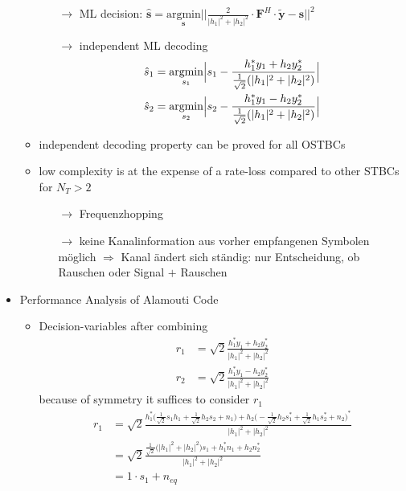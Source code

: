 \documentclass[a4paper, 10pt]{article}
\begin{document}
\begin{itemize}
\begin{itemize}
\begin{itemize}
			\item[$\rightarrow$] ML decision: $\hat{\textbf{s}} = \underset{\textbf{s}}{\text{argmin}}\bigl | \bigl | \frac{2}{|h_1|^2 + |h_2|^2}\cdot \textbf{F}^H\cdot \tilde{\textbf{y}} - \textbf{s}\bigr |\bigr |^2 $
			\item[$\rightarrow$] independent ML decoding 
				\begin{align*}
					\hat{s}_1 &= \underset{s_1}{\text{argmin}} \Bigl |s_1 - \frac{h_1^*y_1 + h_2y_2^*}{\frac{1}{\sqrt{2}}(|h_1|^2 + |h_2|^2)}\Bigr |\\ \hat{s}_2 & = \underset{s_2}{\text{argmin}}\Bigl |s_2 - \frac{h_1^*y_1 - h_2y_2^*}{\frac{1}{\sqrt{2}}(|h_1|^2 + |h_2|^2)}\Bigr|
				\end{align*}
		\end{itemize}
		\item independent decoding property can be proved for all OSTBCs
		\item low complexity is at the expense of a rate-loss compared to other STBCs for $N_T > 2$
		\begin{itemize}
			\item[$\rightarrow$] Frequenzhopping
			\item[$\rightarrow$] keine Kanalinformation aus vorher empfangenen Symbolen m\"oglich $\Rightarrow$ Kanal \"andert sich st\"andig: nur Entscheidung, ob Rauschen oder Signal $+$ Rauschen	
		\end{itemize}
		\end{itemize}
		\item{Performance Analysis of Alamouti Code}
		\begin{itemize}
		\item Decision-variables after combining
		\begin{align*}
			r_1 &= \sqrt{2}\frac{h_1^*y_1 + h_2y_2^*}{|h_1|^2 + |h_2|^2}\\
			r_2 &= \sqrt{2}\frac{h_1^*y_1 - h_2y_2^*}{|h_1|^2 + |h_2|^2}
\end{align*} 
because of symmetry it suffices to consider $r_1$
		\begin{align*}
			r_1 &= \sqrt{2}\frac{h_1^*\bigl(\frac{1}{\sqrt{2}}s_1h_1 + \frac{1}{\sqrt{2}}h_2s_2 + n_1 \bigr) + h_2\bigl(-\frac{1}{\sqrt{2}}h_2s_1^* + \frac{1}{\sqrt{2}}h_1s_2^* + n_2\bigr)^*}{|h_1|^2 + |h_2|^2}\\ 
			&= \sqrt{2}\frac{\frac{1}{\sqrt2} \bigl(|h_1|^2 + |h_2|^2\bigr) s_1 + h_1^*n_1 + h_2n_2^*} {|h_1|^2 + |h_2|^2}\\
			&= 1\cdot s_1 + n_{eq}
		\end{align*}

\end{itemize}
\end{itemize}
\end{document}
